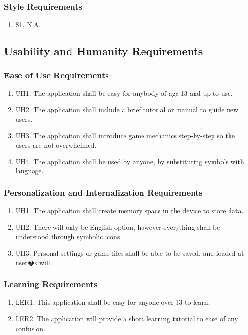 \documentclass[]{article}
\begin{document}
\subsubsection{Style Requirements}
\begin{enumerate}
	\item S1. N.A.
\end{enumerate}

\subsection{Usability and Humanity Requirements}
\subsubsection{Ease of Use Requirements}
\begin{enumerate}
	\item UH1. The application shall be easy for anybody of age 13 and up to use.
	\item UH2. The application shall include a brief tutorial or manual to guide new users.
	\item UH3. The application shall introduce game mechanics step-by-step so the users are not overwhelmed.
	\item UH4. The application shall be used by anyone, by substituting symbols with language. 
\end{enumerate}

\subsubsection{Personalization and Internalization Requirements}
\begin{enumerate}
 \item UH1. The application shall create memory space in the device to store data.
 \item UH2. There will only be English option, however everything shall be understood through symbolic icons.
 \item UH3. Personal settings or game files shall be able to be saved, and loaded at user�s will.
\end{enumerate}

\subsubsection{Learning Requirements}
\begin{enumerate}
	\item LER1. This application shall be easy for anyone over 13 to learn.
	\item LER2. The application will provide a short learning tutorial to ease of any confusion.
\end{enumerate}
\end{document}
